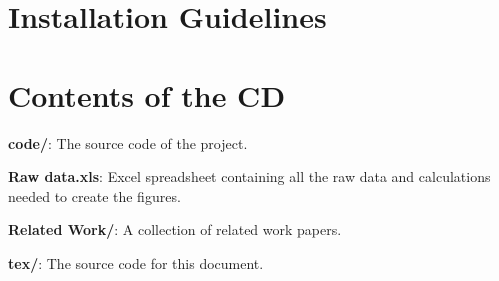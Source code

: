 \appendix

\chapter{Installation Guidelines}

\chapter{Contents of the CD}


\textbf{code/}: The source code of the project.

\textbf{Raw data.xls}: Excel spreadsheet containing all the raw data and calculations needed to create the figures.

\textbf{Related Work/}: A collection of related work papers.

\textbf{tex/}: The source code for this document.
